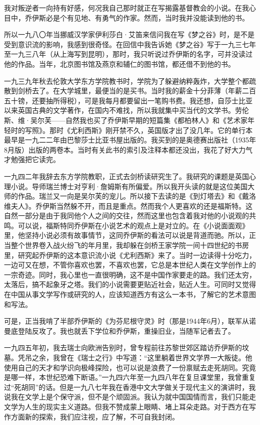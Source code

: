 \par 我对叛逆者一向持有好感，何况我自己那时就正在写揭露基督教会的小说。在我心目中，乔伊斯必是个有见地、有勇气的作家。然而，当时我并没能读到他的书。
\par 所以一九八〇年当挪威汉学家伊利莎白·艾笛来信问我在写《梦之谷》时，是不是受到意识流的影响，我感到很奇怪。在回信中我告诉她《梦之谷》写于一九三七年至一九三八年（从上海写到昆明），那时，我只听说过乔伊斯的名字，可并没读过他的作品。当年，北京图书馆及燕京和辅仁的图书馆，都还借不到他的书。
\par 一九三九年秋去伦敦大学东方学院教书时，学院为了躲避纳粹轰炸，大学整个都疏散到剑桥去了。在大学城里，最便当的是买书。当时我的薪金十分菲薄（年薪二百五十镑，还要抽所得税），可是我每月都要留出一笔购书费。我还想，自莎士比亚以来英国古典的文学著作，在国内不难找，所以我就集中买当代的文学书。劳伦斯、维·吴尔芙——自然我也买了乔伊斯早期的短篇集《都柏林人》和《艺术家年轻时的写照》。那时《尤利西斯》刚开禁不久，英国版才出了没几年。它的单行本最早是一九二二年由巴黎莎士比亚书屋出版的。我买到的是奥德赛出版社（1935年8月版）出版的两卷本。当时有关此书的索引及注释本都还没出，我花了好大力气才勉强把它读完。
\par 一九四二年我辞去东方学院教职，正式去剑桥读研究生了。我研究的课题是英国心理小说。导师瑞兰博士对亨利·詹姆斯有所偏爱。所以我开头读的就是这位美国大师的作品。瑞兰又一向是吴尔芙的宠儿。所以接下去读的是《到灯塔去》和《戴洛维夫人》。乔伊斯当然躲不开，而且是重点。然而我个人更喜欢的还是福斯特。这自然一部分是由于我同他个人之间的交往，然而这里也包含着我对他的小说观的共鸣。可以说，福斯特同乔伊斯在小说艺术的观点上是对立的。在《小说面面观》里，他坚持小说必须有故事情节，这同乔伊斯的看法可以说是背道而驰。所以，正当整个世界卷入战火纷飞的年月里，我却躲在剑桥王家学院一间十四世纪的书房里，研究起乔伊斯的这本意识流小说《尤利西斯》来了。当时一边读得十分吃力，一边可又在想，不管你喜欢也罢，不喜欢也罢，它总是本世纪人类在文学创作上的一宗奇迹。同时，我心里也一直很明确，这不是中国作家要走的路。我们还太穷，太落后，搞不起象牙之塔。我们的小说需要更贴近社会，贴近人生。可同时又觉得在中国从事文学写作或研究的人，应该知道西方有这么一本书，了解它的艺术意图和写法。
\par 可是，正当我啃了半部乔伊斯的《为芬尼根守灵》时（那是1944年6月），联军从诺曼底登陆反攻了。我也就丢下学位和乔伊斯，重操旧业，当随军记者去了。
\par 一九四五年初，我去瑞士向欧洲告别时，曾专程前往苏黎世郊区踏访乔伊斯的坟墓。凭吊之余，我曾在《瑞士之行》中写道：“这里躺着世界文学界一大叛徒。他使用自己的天才和学识向极峰探险，也可以说是浪费了一份禀赋去走死胡同。究竟是哪一样，本世纪恐难下断语。”一九四六年至一九四八年在复旦课堂里，我曾重复过“死胡同”的话。但是一九八七年我在香港中文大学做关于现代主义的演讲时，我说我在文学上是个保守派，但不是个顽固派。我认为就中国国情而言，我们只能走文学为人生的现实主义道路。但我不赞成蒙上眼睛、堵上耳朵走路。对于西方在写作方面新的探索，我们应注视，应了解，不可自我封闭。
